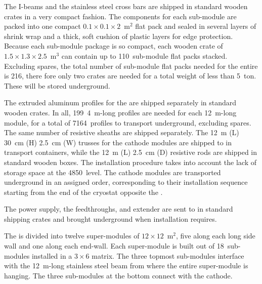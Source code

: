 The   I-beams and the stainless steel cross bars are shipped in standard wooden crates in a very compact fashion.
The components for each  sub-module are packed into one compact  $0.1 \times 0.1 \times 2$~m$^2$ flat pack and sealed in several layers of shrink wrap and a thick, soft cushion of plastic layers for edge protection.
Because each sub-module package is so compact, each wooden crate of $1.5 \times 1.3 \times 2.5$~m$^3$ can contain up to 110~sub-module flat packs stacked.
Excluding spares, the total number of sub-module flat packs needed for the entire  is 216, there fore only two crates are needed for a total weight of less than 5~ton. These will be stored underground.

The extruded aluminum profiles for the  are shipped separately in standard wooden crates.
In all, 199~4~m-long profiles are needed for each 12~m-long  module, for a total of 7164~profiles to transport underground, excluding spares.
The same number of resistive sheaths are shipped separately.
The 12~m (L) 30~cm (H) 2.5~cm (W) trusses for the cathode modules are shipped to  in transport containers, while the 12~m (L) 2.5~cm (D) resistive rods are shipped in standard wooden boxes.
The installation procedure takes into account the lack of storage space at the 4850~level.
The cathode modules are transported underground in an assigned order, corresponding to their installation sequence starting from the end of the cryostat opposite the .

The power supply, the  feedthroughs, and  extender are sent to  in standard shipping crates and brought underground when installation requires.

The  is divided into twelve super-modules of $12\times12$~m$^2$, five along each long side wall and one along each end-wall.
Each super-module is built out of 18~sub-modules installed in a $3 \times 6$ matrix.
The three topmost sub-modules interface with the 12~m-long stainless steel beam from where the entire super-module is hanging.
The three sub-modules at the bottom connect with the cathode.

